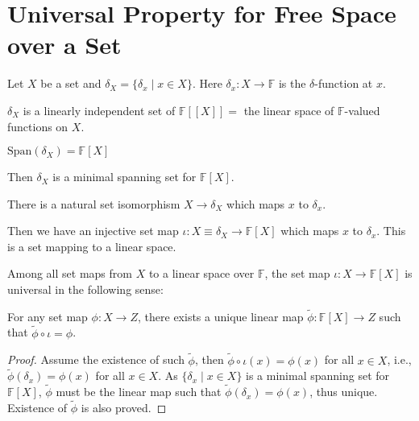 \documentclass[
	11pt, %
	fleqn, %
	a4paper, %
]{LegrandOrangeBook}
\renewcommand{\span}[1]{\text{Span}(#1)} %
\newcommand{\F}{\mathbb{F}} %
\begin{document}
\newpage

\section{Universal Property for Free Space over a Set}

Let $X$ be a set and $\delta_X = \{ \delta_x \mid x \in X \}$. Here $\delta_x : X \to \F$ is the $\delta$-function at $x$. 

\begin{proposition}
    $\delta_X$ is a linearly independent set of $\F[[X]] =$ the linear space of $\F$-valued functions on $X$.
\end{proposition}

\begin{proposition}
    $\span{\delta_X} = \F[X]$
\end{proposition}

Then $\delta_X$ is a minimal spanning set for $\F[X]$.

\begin{proposition}
    There is a natural set isomorphism $X \to \delta_X$ which maps $x$ to $\delta_x$.
\end{proposition}

Then we have an injective set map $\iota : X \equiv \delta_X \to \F[X]$ which maps $x$ to $\delta_x$. This is a set mapping to a linear space.

Among all set maps from $X$ to a linear space over $\F$, the set map $\iota : X \to \F[X]$ is universal in the following sense:
\begin{center}
\end{center}
For any set map $\phi : X \to Z$, there exists a unique linear map $\tilde{\phi} : \F[X] \to Z$ such that $\tilde{\phi} \circ \iota = \phi$.

\begin{proof}
    Assume the existence of such $\tilde{\phi}$, then $\tilde{\phi} \circ \iota (x) = \phi(x)$ for all $x \in X$, i.e., $\tilde{\phi} (\delta_x) = \phi(x)$ for all $x \in X$. As $\{ \delta_x \mid x \in X \}$ is a minimal spanning set for $\F[X]$, $\tilde{\phi}$ must be the linear map such that $\tilde{\phi} (\delta_x) = \phi(x)$, thus unique. Existence of $\tilde{\phi}$ is also proved.
\end{proof}
\end{document}
